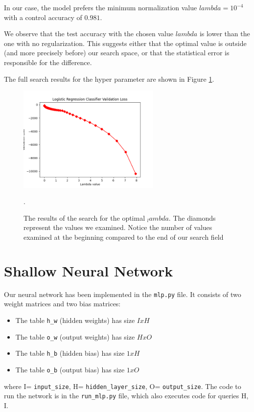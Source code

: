 \documentclass{article}
\newcommand{\code}{\texttt}
\begin{document}
In our case, the model prefers the minimum normalization value \code{$lambda = 10^{-4}$} with a control accuracy of $0.981$. 

We observe that the test accuracy with the chosen value \code{$lambda$} is lower than the one with no regularization. This suggests either that the optimal value is outside (and more precisely before) our search space, or that the statistical error is responsible for the difference.

The full search results for the hyper parameter are shown in Figure \ref{logistic_lambda_accuracy}.

\begin{figure}
	\includegraphics[width=7cm]{logistic_lambda_accuracy.png}
	\centering
	\caption{ The results of the search for the optimal \code{$_lambda$}. The diamonds represent the values we examined. Notice the number of values examined at the beginning compared to the end of our search field}.
	\label{logistic_lambda_accuracy}
\end{figure}


\section{Shallow Neural Network}


Our neural network has been implemented in the \code{mlp.py} file. It consists of two weight matrices and two bias matrices:

\begin{itemize}
	\item The table \code{h\_w} (hidden weights) has size $IxH$
	\item The table \code{o\_w} (output weights) has size $HxO$
	\item The table \code{h\_b} (hidden bias) has size $1xH$
	\item The table \code{o\_b} (output bias) has size $1xO$
\end{itemize}

where I= \code{input\_size}, H= \code{hidden\_layer\_size}, O= \code{output\_size}. The code to run the network is in the \code{run\_mlp.py} file, which also executes code for queries H, I.
\end{document}
